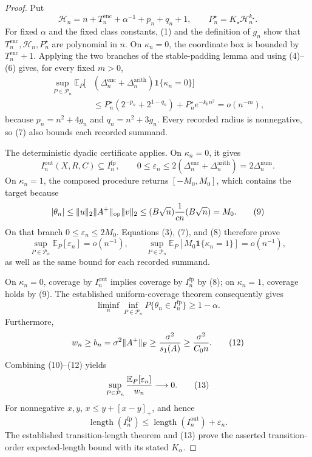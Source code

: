 \documentclass{article}
\begin{document}
\begin{proof}
Put
\[
\mathcal H_n=n+T_n^{\mathrm{enc}}+\alpha^{-1}+p_n+q_n+1,
\qquad P_n^\star=K_\star\mathcal H_n^{k_\star}.
\]
For fixed \(\alpha\) and the fixed class constants, (1) and the definition of
\(g_n\) show that \(T_n^{\mathrm{enc}},\mathcal H_n,P_n^\star\) are polynomial
in \(n\).  On \(\kappa_n=0\), the coordinate box is bounded by
\(T_n^{\mathrm{enc}}+1\).  Applying the two branches of the stable-padding lemma
and using (4)--(6) gives, for every fixed \(m>0\),
\[
\begin{aligned}
\sup_{P\in\mathcal P_n}\mathbb E_P[&
(\Delta_n^{\mathrm{enc}}+\Delta_n^{\mathrm{arith}})
\mathbf1\{\kappa_n=0\}]\\
&\le P_n^\star(2^{-p_n}+2^{1-q_n})+P_n^\star e^{-k_0n^2}
=o(n^{-m}),
\end{aligned}                                                        \tag{7}
\]
because \(p_n=n^2+4g_n\) and \(q_n=n^2+3g_n\).  Every recorded radius is
nonnegative, so (7) also bounds each recorded summand.

The deterministic dyadic certificate applies.  On \(\kappa_n=0\), it gives
\[
I_n^{\mathrm{out}}(X,R,C)\subseteq I_n^{\mathrm{fp}},
\qquad
0\le\varepsilon_n
\le2(\Delta_n^{\mathrm{enc}}+\Delta_n^{\mathrm{arith}})
=2\Delta_n^{\mathrm{num}}.                                          \tag{8}
\]
On \(\kappa_n=1\), the composed procedure returns \([-M_0,M_0]\), which
contains the target because
\[
|\theta_n|
\le\|u\|_2\|A^+\|_{
\mathrm{op}}\|v\|_2
\le(B\sqrt n){1\over cn}(B\sqrt n)=M_0.                              \tag{9}
\]
On that branch \(0\le\varepsilon_n\le2M_0\).  Equations (3), (7), and (8)
therefore prove
\[
\sup_{P\in\mathcal P_n}\mathbb E_P[\varepsilon_n]=o(n^{-1}),
\qquad
\sup_{P\in\mathcal P_n}\mathbb E_P[
M_0\mathbf1\{\kappa_n=1\}]=o(n^{-1}),                               \tag{10}
\]
as well as the same bound for each recorded summand.

On \(\kappa_n=0\), coverage by \(I_n^{\mathrm{out}}\) implies coverage by
\(I_n^{\mathrm{fp}}\) by (8); on \(\kappa_n=1\), coverage holds by (9).
The established uniform-coverage theorem consequently gives
\[
\liminf_n\inf_{P\in\mathcal P_n}
P\{\theta_n\in I_n^{\mathrm{fp}}\}\ge1-\alpha.                       \tag{11}
\]
Furthermore,
\[
w_n\ge b_n=\sigma^2\|A^+\|_{
\mathrm F}
\ge{\sigma^2\over s_1(A)}\ge{\sigma^2\over C_0n}.                  \tag{12}
\]
Combining (10)--(12) yields
\[
\sup_{P\in\mathcal P_n}{\mathbb E_P[\varepsilon_n]\over w_n}
\longrightarrow0.                                                    \tag{13}
\]
For nonnegative \(x,y\), \(x\le y+[x-y]_+\), and hence
\[
\operatorname{length}(I_n^{\mathrm{fp}})
\le\operatorname{length}(I_n^{\mathrm{out}})+\varepsilon_n.
\]
The established transition-length theorem and (13) prove the asserted
transition-order expected-length bound with its stated \(K_\alpha\).


\end{proof}
\end{document}
